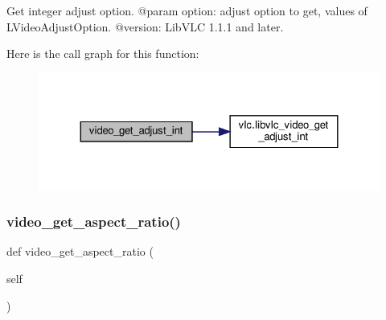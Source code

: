 \begin{DoxyVerb}Get integer adjust option.
@param option: adjust option to get, values of L{VideoAdjustOption}.
@version: LibVLC 1.1.1 and later.
\end{DoxyVerb}
 Here is the call graph for this function\+:
\nopagebreak
\begin{figure}[H]
\begin{center}
\leavevmode
\includegraphics[width=324pt]{classvlc_1_1_media_player_a8b9d77a54530a6a7ef9a686980c0d58b_cgraph}
\end{center}
\end{figure}
\mbox{\label{classvlc_1_1_media_player_af56a4698e1e25d37afd746f59fde9b2d}} 
\subsubsection{\texorpdfstring{video\+\_\+get\+\_\+aspect\+\_\+ratio()}{video\_get\_aspect\_ratio()}}
{\footnotesize\ttfamily def video\+\_\+get\+\_\+aspect\+\_\+ratio (\begin{DoxyParamCaption}\item[{}]{self }\end{DoxyParamCaption})}

